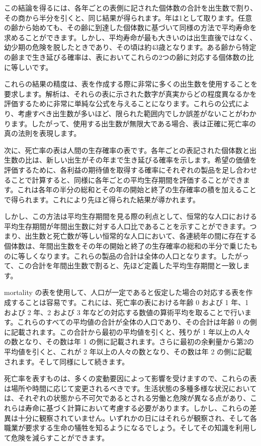 \documentclass[a4paper,11pt,openany]{ltjsbook}
\begin{document}
この結論を得るには、各年ごとの表側に記された個体数の合計を出生数で割り、その商から半分を引くと、同じ結果が得られます。年は1として取ります。任意の齢から始めても、その齢に到達した個体数に基づいて同様の方法で平均寿命を求めることができます。しかし、平均寿命が最も大きいのは出生直後ではなく、幼少期の危険を脱したときであり、その頃は約43歳となります。ある齢から特定の齢まで生き延びる確率は、表においてこれらの2つの齢に対応する個体数の比に等しいです。

これらの結果の精度は、表を作成する際に非常に多くの出生数を使用することを要求します。解析は、それらの表に示された数字が真実からどの程度異なるかを評価するために非常に単純な公式を与えることになります。これらの公式により、考慮すべき出生数が多いほど、限られた範囲内でしか誤差がないことがわかります。したがって、使用する出生数が無限大である場合、表は正確に死亡率の真の法則を表現します。

次に、死亡率の表は人間の生存確率の表です。各年ごとの表記された個体数と出生数の比は、新しい出生がその年まで生き延びる確率を示します。希望の価値を評価するために、各利益の期待値を取得する確率にそれぞれの製品を足し合わせることで計算すると、同様に各年ごとの平均生存期間を評価することができます。これは各年の半分の総和とその年の開始と終了の生存確率の積を加えることで得られます。これにより先ほど得られた結果が導かれます。

しかし、この方法は平均生存期間を見る際の利点として、恒常的な人口における平均生存期間が年間出生数に対する人口比であることを示すことができます。つまり、出生数と死亡数が等しい恒常的な人口において、各連続年の間に存在する個体数は、年間出生数をその年の開始と終了の生存確率の総和の半分で乗じたものに等しくなります。これらの製品の合計は全体の人口となります。したがって、この合計を年間出生数で割ると、先ほど定義した平均生存期間と一致します。

mortality の表を使用して、人口が一定であると仮定した場合の対応する表を作成することは容易です。これには、死亡率の表における年齢 0 および 1 年、1 および 2 年、2 および 3 年などの対応する数値の算術平均を取ることで行います。これらのすべての平均値の合計が全体の人口であり、その合計は年齢 0 の側に記載されます。この合計から最初の平均値を引くと、残りが 1 年以上の人々の数となり、その数は年 1 の側に記載されます。さらに最初の余剰量から第2の平均値を引くと、これが 2 年以上の人々の数となり、その数は年 2 の側に記載されます。そして同様にして続きます。

死亡率を表すものは、多くの変動要因によって影響を受けますので、これらの表は場所や時間に応じて変更されるべきです。生活状態の多種多様な状況においては、それぞれの状態から不可欠であるとされる労働と危険が異なる点があり、これらは寿命に基づく計算において考慮する必要があります。しかし、これらの差異は十分に観察されていません。いずれかの日にはそれらが観察され、そして各職業が要求する生命の犠牲を知るようになるでしょう。そしてその知識を利用して危険を減らすことができます。
\end{document}
